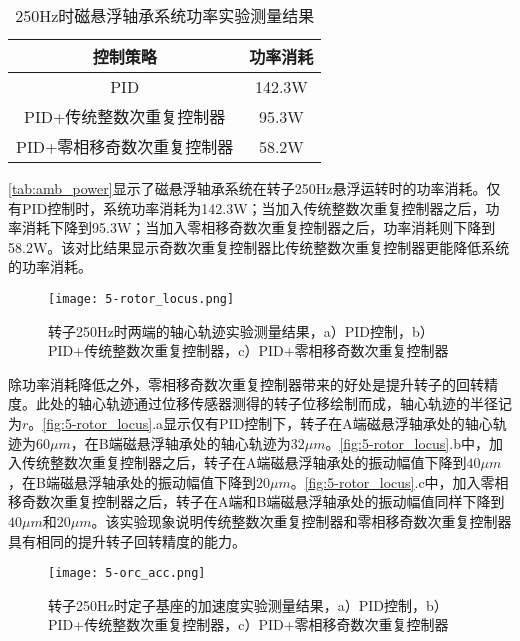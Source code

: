 \begin{table}[htb]
  \caption[250Hz时磁悬浮轴承系统功率实验测量结果]{250Hz时磁悬浮轴承系统功率实验测量结果\label{tab:amb_power}}
  \begin{tabular}{cc}
    \toprule
    控制策略 & 功率消耗 \\
    \midrule
    PID & 142.3W\\
    PID+传统整数次重复控制器 & 95.3W\\
    PID+零相移奇数次重复控制器 & 58.2W\\
    \bottomrule
  \end{tabular}
\end{table}

\autoref{tab:amb_power}显示了磁悬浮轴承系统在转子250Hz悬浮运转时的功率消耗。仅有PID控制时，系统功率消耗为142.3W；当加入传统整数次重复控制器之后，功率消耗下降到95.3W；当加入零相移奇数次重复控制器之后，功率消耗则下降到58.2W。该对比结果显示奇数次重复控制器比传统整数次重复控制器更能降低系统的功率消耗。

\begin{figure}
	\texttt{[image: 5-rotor\_locus.png]}
	\caption{转子250Hz时两端的轴心轨迹实验测量结果，a）PID控制，b）PID+传统整数次重复控制器，c）PID+零相移奇数次重复控制器}
	\label{fig:5-rotor_locus}
\end{figure}

除功率消耗降低之外，零相移奇数次重复控制器带来的好处是提升转子的回转精度。此处的轴心轨迹通过位移传感器测得的转子位移绘制而成，轴心轨迹的半径记为$r$。\autoref{fig:5-rotor_locus}.a显示仅有PID控制下，转子在A端磁悬浮轴承处的轴心轨迹为$60\mu m$，在B端磁悬浮轴承处的轴心轨迹为$32\mu m$。\autoref{fig:5-rotor_locus}.b中，加入传统整数次重复控制器之后，转子在A端磁悬浮轴承处的振动幅值下降到$40\mu m$，在B端磁悬浮轴承处的振动幅值下降到$20\mu m$。\autoref{fig:5-rotor_locus}.c中，加入零相移奇数次重复控制器之后，转子在A端和B端磁悬浮轴承处的振动幅值同样下降到$40\mu m$和$20\mu m$。该实验现象说明传统整数次重复控制器和零相移奇数次重复控制器具有相同的提升转子回转精度的能力。

\begin{figure}
	\texttt{[image: 5-orc\_acc.png]}
	\caption{转子250Hz时定子基座的加速度实验测量结果，a）PID控制，b）PID+传统整数次重复控制器，c）PID+零相移奇数次重复控制器}
	\label{fig:5-orc_acc}
\end{figure}

